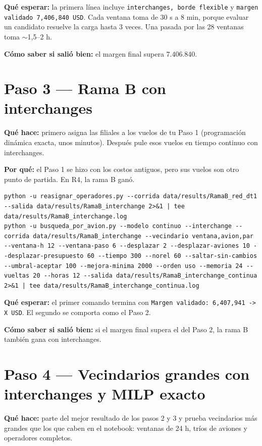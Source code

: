 \documentclass[11pt,a4paper]{article}
\newcommand{\campo}[1]{\par\smallskip\textbf{\color{acento}#1}\quad}
\begin{document}
\campo{Qué esperar:} la primera línea incluye \texttt{interchanges, borde flexible} y \texttt{margen validado 7,406,840 USD}. Cada ventana toma de 30 s a 8 min, porque evaluar un candidato resuelve la carga hasta 3 veces. Una pasada por las 28 ventanas toma $\sim$1,5--2 h.

\campo{Cómo saber si salió bien:} el margen final supera 7.406.840.

\section{Paso 3 --- Rama B con interchanges}

\campo{Qué hace:} primero asigna las filiales a los vuelos de tu Paso 1 (programación dinámica exacta, unos minutos). Después pule esos vuelos en tiempo continuo con interchanges.

\campo{Por qué:} el Paso 1 se hizo con los costos antiguos, pero sus vuelos son otro punto de partida. En R4, la rama B ganó.

\begin{lstlisting}
python -u reasignar_operadores.py --corrida data/results/RamaB_red_dt1 --salida data/results/RamaB_interchange 2>&1 | tee data/results/RamaB_interchange.log
python -u busqueda_por_avion.py --modelo continuo --interchange --corrida data/results/RamaB_interchange --vecindario ventana,avion,par --ventana-h 12 --ventana-paso 6 --desplazar 2 --desplazar-aviones 10 --desplazar-presupuesto 60 --tiempo 300 --norel 60 --saltar-sin-cambios --umbral-aceptar 100 --mejora-minima 2000 --orden uso --memoria 24 --vueltas 20 --horas 12 --salida data/results/RamaB_interchange_continua 2>&1 | tee data/results/RamaB_interchange_continua.log
\end{lstlisting}

\campo{Qué esperar:} el primer comando termina con \texttt{Margen validado: 6,407,941 -> X USD}. El segundo se comporta como el Paso 2.

\campo{Cómo saber si salió bien:} si el margen final supera el del Paso 2, la rama B también gana con interchanges.

\section{Paso 4 --- Vecindarios grandes con interchanges y MILP exacto}

\campo{Qué hace:} parte del mejor resultado de los pasos 2 y 3 y prueba vecindarios más grandes que los que caben en el notebook: ventanas de 24 h, tríos de aviones y operadores completos.
\end{document}
